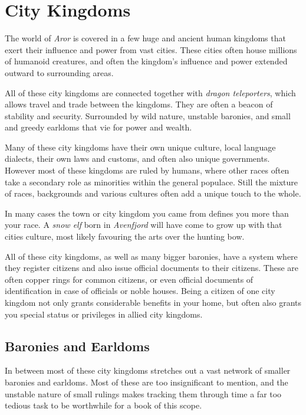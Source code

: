 \section{City Kingdoms}

The world of \emph{Aror} is covered in a few huge and ancient human kingdoms
that exert their influence and power from vast cities. These cities often house
millions of humanoid creatures, and often the kingdom's influence and power
extended outward to surrounding areas.

All of these city kingdoms are connected together with \emph{dragon
  teleporters}, which allows travel and trade between the kingdoms. They are
often a beacon of stability and security. Surrounded by wild nature, unstable
baronies, and small and greedy earldoms that vie for power and wealth.

Many of these city kingdoms have their own unique culture, local language
dialects, their own laws and customs, and often also unique governments. However
most of these kingdoms are ruled by humans, where other races often take a
secondary role as minorities within the general populace. Still the mixture
of races, backgrounds and various cultures often add a unique touch to the
whole.

In many cases the town or city kingdom you came from defines you more than
your race. A \emph{snow elf} born in \emph{Avenfjord} will have come to grow
up with that cities culture, most likely favouring the arts over the hunting
bow.

All of these city kingdoms, as well as many bigger baronies, have a system
where they register citizens and also issue official documents to their
citizens. These are often copper rings for common citizens, or even official
documents of identification in case of officials or noble houses. Being a
citizen of one city kingdom not only grants considerable benefits in your
home, but often also grants you special status or privileges in allied city
kingdoms.

\subsection{Baronies and Earldoms}

In between most of these city kingdoms stretches out a vast network of smaller
baronies and earldoms. Most of these are too insignificant to mention, and the
unstable nature of small rulings makes tracking them through time a far too
tedious task to be worthwhile for a book of this scope.


